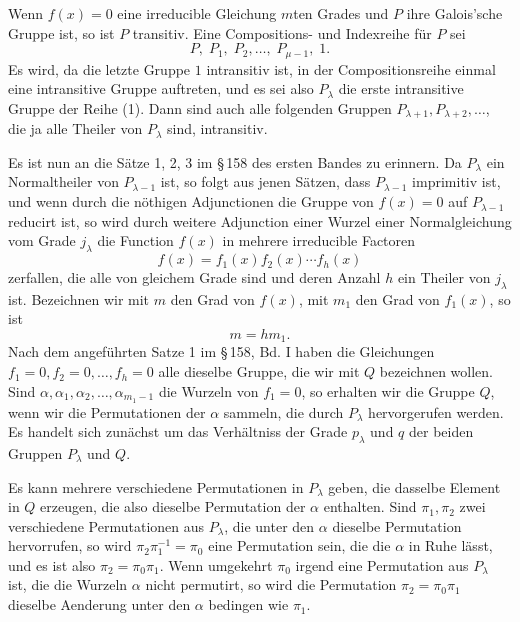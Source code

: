 \documentclass[11pt]{article}
\begin{document}
Wenn $f(x)=0$ eine irreducible Gleichung $m$ten Grades und $P$ ihre Galois'sche Gruppe ist, so ist $P$ transitiv. Eine Compositions- und Indexreihe für $P$ sei
\begin{equation}
 P,\;P_1,\;P_2,\ldots,\;P_{\mu-1},\;1 .
 \tag{1}
\end{equation}
Es wird, da die letzte Gruppe $1$ intransitiv ist, in der Compositionsreihe einmal eine intransitive Gruppe auftreten, und es sei also $P_\lambda$ die erste intransitive Gruppe der Reihe (1). Dann sind auch alle folgenden Gruppen $P_{\lambda+1},P_{\lambda+2},\ldots$, die ja alle Theiler von $P_\lambda$ sind, intransitiv.

Es ist nun an die Sätze 1, 2, 3 im \S\,158 des ersten Bandes zu erinnern. Da $P_\lambda$ ein Normaltheiler von $P_{\lambda-1}$ ist, so folgt aus jenen Sätzen, dass $P_{\lambda-1}$ imprimitiv ist, und wenn durch die nöthigen Adjunctionen die Gruppe von $f(x)=0$ auf $P_{\lambda-1}$ reducirt ist, so wird durch weitere Adjunction einer Wurzel einer Normalgleichung vom Grade $j_\lambda$ die Function $f(x)$ in mehrere irreducible Factoren
\begin{equation}
 f(x)=f_1(x)f_2(x)\cdots f_h(x)
 \tag{2}
\end{equation}
zerfallen, die alle von gleichem Grade sind und deren Anzahl $h$ ein Theiler von $j_\lambda$ ist. Bezeichnen wir mit $m$ den Grad von $f(x)$, mit $m_1$ den Grad von $f_1(x)$, so ist
\begin{equation}
 m=hm_1 .
 \tag{3}
\end{equation}
Nach dem angeführten Satze 1 im \S\,158, Bd. I haben die Gleichungen $f_1=0,f_2=0,\ldots,f_h=0$ alle dieselbe Gruppe, die wir mit $Q$ bezeichnen wollen. Sind $\alpha,\alpha_1,\alpha_2,\ldots,\alpha_{m_1-1}$ die Wurzeln von $f_1=0$, so erhalten wir die Gruppe $Q$, wenn wir die Permutationen der $\alpha$ sammeln, die durch $P_\lambda$ hervorgerufen werden. Es handelt sich zunächst um das Verhältniss der Grade $p_\lambda$ und $q$ der beiden Gruppen $P_\lambda$ und $Q$.

Es kann mehrere verschiedene Permutationen in $P_\lambda$ geben, die dasselbe Element in $Q$ erzeugen, die also dieselbe Permutation der $\alpha$ enthalten. Sind $\pi_1,\pi_2$ zwei verschiedene Permutationen aus $P_\lambda$, die unter den $\alpha$ dieselbe Permutation hervorrufen, so wird $\pi_2\pi_1^{-1}=\pi_0$ eine Permutation sein, die die $\alpha$ in Ruhe lässt, und es ist also $\pi_2=\pi_0\pi_1$. Wenn umgekehrt $\pi_0$ irgend eine Permutation aus $P_\lambda$ ist, die die Wurzeln $\alpha$ nicht permutirt, so wird die Permutation $\pi_2=\pi_0\pi_1$ dieselbe Aenderung unter den $\alpha$ bedingen wie $\pi_1$.
\end{document}
